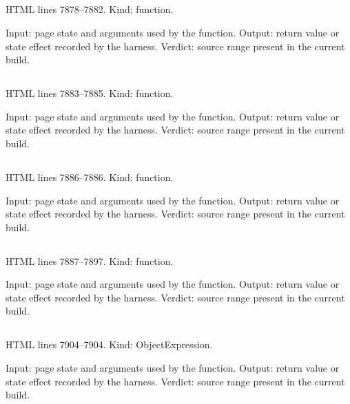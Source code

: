 \subsection*{\texttt{}}
\label{vf_397_mgOpen}
HTML lines 7878--7882. Kind: function.

Input: page state and arguments used by the function.
Output: return value or state effect recorded by the harness.
Verdict: source range present in the current build.

\subsection*{\texttt{}}
\label{vf_398_mgClose}
HTML lines 7883--7885. Kind: function.

Input: page state and arguments used by the function.
Output: return value or state effect recorded by the harness.
Verdict: source range present in the current build.

\subsection*{\texttt{}}
\label{vf_399_mgToggle}
HTML lines 7886--7886. Kind: function.

Input: page state and arguments used by the function.
Output: return value or state effect recorded by the harness.
Verdict: source range present in the current build.

\subsection*{\texttt{}}
\label{vf_400_mgInit}
HTML lines 7887--7897. Kind: function.

Input: page state and arguments used by the function.
Output: return value or state effect recorded by the harness.
Verdict: source range present in the current build.

\subsection*{\texttt{}}
\label{vf_401_APP_STATS}
HTML lines 7904--7904. Kind: ObjectExpression.

Input: page state and arguments used by the function.
Output: return value or state effect recorded by the harness.
Verdict: source range present in the current build.

